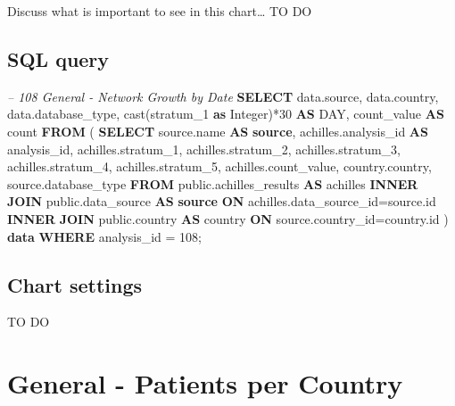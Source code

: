\documentclass[]{book}
\newenvironment{Shaded}{\begin{snugshade}}{\end{snugshade}}
\newcommand{\KeywordTok}[1]{\textcolor[rgb]{0.13,0.29,0.53}{\textbf{#1}}}
\newcommand{\DataTypeTok}[1]{\textcolor[rgb]{0.13,0.29,0.53}{#1}}
\newcommand{\DecValTok}[1]{\textcolor[rgb]{0.00,0.00,0.81}{#1}}
\newcommand{\CommentTok}[1]{\textcolor[rgb]{0.56,0.35,0.01}{\textit{#1}}}
\newcommand{\FunctionTok}[1]{\textcolor[rgb]{0.00,0.00,0.00}{#1}}
\newcommand{\NormalTok}[1]{#1}
\begin{document}
Discuss what is important to see in this chart\ldots{} TO DO

\subsection{SQL query}\label{sql-query-3}

\begin{Shaded}
\begin{Highlighting}[]
\CommentTok{-- 108    General - Network Growth by Date}
\KeywordTok{SELECT}\NormalTok{ data.source,}
\NormalTok{       data.country,}
\NormalTok{       data.database_type,}
       \FunctionTok{cast}\NormalTok{(stratum_1 }\KeywordTok{as} \DataTypeTok{Integer}\NormalTok{)*}\DecValTok{30} \KeywordTok{AS} \DataTypeTok{DAY}\NormalTok{,}
\NormalTok{       count_value                   }\KeywordTok{AS} \FunctionTok{count}
\KeywordTok{FROM}\NormalTok{ (}
     \KeywordTok{SELECT}\NormalTok{ source.name              }\KeywordTok{AS} \KeywordTok{source}\NormalTok{,}
\NormalTok{            achilles.analysis_id     }\KeywordTok{AS}\NormalTok{ analysis_id,}
\NormalTok{            achilles.stratum_1,}
\NormalTok{            achilles.stratum_2,}
\NormalTok{            achilles.stratum_3,}
\NormalTok{            achilles.stratum_4,}
\NormalTok{            achilles.stratum_5,}
\NormalTok{            achilles.count_value,}
\NormalTok{            country.country,}
\NormalTok{            source.database_type}
     \KeywordTok{FROM}\NormalTok{ public.achilles_results }\KeywordTok{AS}\NormalTok{ achilles }\KeywordTok{INNER} \KeywordTok{JOIN} 
\NormalTok{      public.data_source }\KeywordTok{AS} \KeywordTok{source} \KeywordTok{ON} 
\NormalTok{      achilles.data_source_id=source.id}
     \KeywordTok{INNER} \KeywordTok{JOIN}\NormalTok{ public.country }\KeywordTok{AS}\NormalTok{ country }\KeywordTok{ON} 
\NormalTok{      source.country_id=country.id}
\NormalTok{     ) }\KeywordTok{data}
\KeywordTok{WHERE}\NormalTok{ analysis_id = }\DecValTok{108}\NormalTok{;}
\end{Highlighting}
\end{Shaded}

\subsection{Chart settings}\label{chart-settings-4}

TO DO

\section{General - Patients per
Country}\label{general---patients-per-country}
\end{document}
